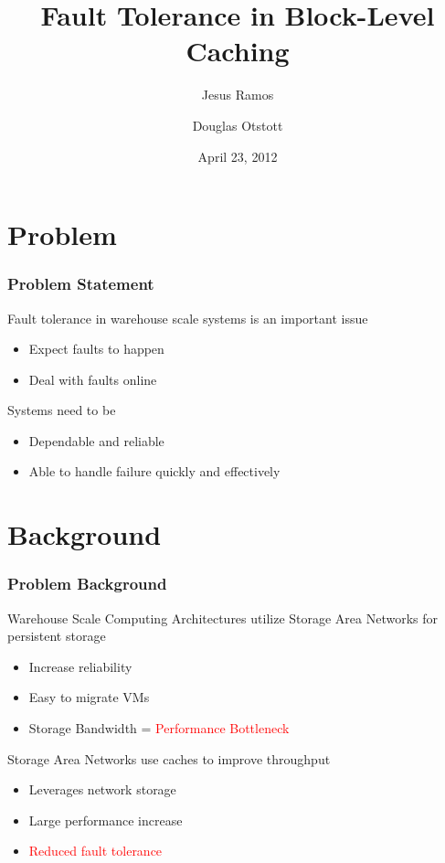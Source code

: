 \documentclass{beamer}
\title[Fault Tolerance]{Fault Tolerance in Block-Level Caching}
\author{
  Jesus Ramos \and
  Douglas Otstott
}
\institute[FIU]{Florida International University}
\date{April 23, 2012}
\begin{document}
\maketitle

\section{Problem}

\begin{frame}
  \frametitle{Problem Statement}
  
  Fault tolerance in warehouse scale systems is an important issue
  \begin{itemize}
    \item Expect faults to happen
    \item Deal with faults online
  \end{itemize}

  Systems need to be
  \begin{itemize}
    \item Dependable and reliable
    \item Able to handle failure quickly and effectively
  \end{itemize}

\end{frame}

\section{Background}

\begin{frame}
  \frametitle{Problem Background}

  Warehouse Scale Computing Architectures utilize Storage Area
  Networks for persistent storage
  \begin{itemize}
    \item Increase reliability
    \item Easy to migrate VMs
    \item Storage Bandwidth  = \textcolor{red}{Performance Bottleneck}
  \end{itemize}

  Storage Area Networks use caches to improve throughput
  \begin{itemize}
    \item Leverages network storage
    \item Large performance increase
    \item \textcolor{red}{Reduced fault tolerance}
  \end{itemize}

\end{frame}
\end{document}
